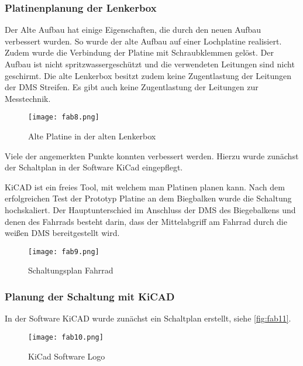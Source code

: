 \subsubsection{Platinenplanung der Lenkerbox}
Der Alte Aufbau hat einige Eigenschaften, die durch den neuen Aufbau verbessert wurden. So wurde der alte Aufbau auf einer Lochplatine realisiert.
Zudem wurde die Verbindung der Platine mit Schraubklemmen gelöst. Der Aufbau ist nicht spritzwassergeschützt und die verwendeten Leitungen sind nicht geschirmt.
Die alte Lenkerbox besitzt zudem keine Zugentlastung der Leitungen der DMS Streifen. Es gibt auch keine Zugentlastung der Leitungen zur Messtechnik. 
\begin{figure}[h]
    \begin{center}
        \texttt{[image: fab8.png]}
        \caption[Alte Platine in der alten Lenkerbox (Abbildungsverzeichnis)]{Alte Platine in der alten Lenkerbox}
        
       \label{fig:fab8}
    \end{center}
\end{figure}

Viele der angemerkten Punkte konnten verbessert werden. Hierzu wurde zunächst der Schaltplan in der Software KiCad\cite{KiCadWebsite} eingepflegt.

KiCAD ist ein freies Tool, mit welchem man Platinen planen kann. Nach dem erfolgreichen Test der Prototyp Platine an dem Biegbalken wurde die Schaltung hochskaliert. Der Hauptunterschied im Anschluss der DMS des Biegebalkens und denen des Fahrrads besteht darin, dass der Mittelabgriff am Fahrrad durch die weißen DMS bereitgestellt wird.
\begin{figure}[h]
    \begin{center}
        \texttt{[image: fab9.png]}
        \caption[Schaltungsplan Fahrrad (Abbildungsverzeichnis)]{Schaltungsplan Fahrrad}
        
        \label{fig:fab9}
    \end{center}
\end{figure}

\subsubsection{Planung der Schaltung mit KiCAD}
In der Software KiCAD\cite{KiCadWebsite} wurde zunächst ein Schaltplan erstellt, siehe \ref{fig:fab11}.
\begin{figure}[h]
    \begin{center}
        \texttt{[image: fab10.png]}
        \caption[KiCad Software Logo (Abbildungsverzeichnis)]{KiCad Software Logo}
        \cite{KiCadWebsite}
        \label{fig:fab10}
    \end{center}
\end{figure}


